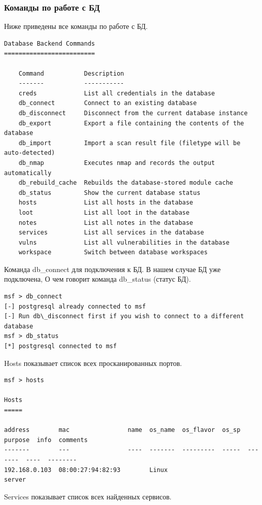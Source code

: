 \documentclass[10pt,a4paper]{report}
\begin{document}
\subsubsection{Команды по работе с БД}
Ниже приведены все команды по работе с БД.
\begin{verbatim}
Database Backend Commands
=========================

    Command           Description
    -------           -----------
    creds             List all credentials in the database
    db_connect        Connect to an existing database
    db_disconnect     Disconnect from the current database instance
    db_export         Export a file containing the contents of the database
    db_import         Import a scan result file (filetype will be auto-detected)
    db_nmap           Executes nmap and records the output automatically
    db_rebuild_cache  Rebuilds the database-stored module cache
    db_status         Show the current database status
    hosts             List all hosts in the database
    loot              List all loot in the database
    notes             List all notes in the database
    services          List all services in the database
    vulns             List all vulnerabilities in the database
    workspace         Switch between database workspaces
\end{verbatim}
Команда db\_connect для подключения к БД. В нашем случае БД уже подключена, О чем говорит команда db\_status (статус БД).
\begin{verbatim}
msf > db_connect
[-] postgresql already connected to msf
[-] Run db\_disconnect first if you wish to connect to a different database
msf > db_status
[*] postgresql connected to msf
\end{verbatim}
Hosts показывает список всех просканированных портов.
\begin{verbatim}
msf > hosts

Hosts
=====

address        mac                name  os_name  os_flavor  os_sp  purpose  info  comments
-------        ---                ----  -------  ---------  -----  -------  ----  --------
192.168.0.103  08:00:27:94:82:93        Linux                      server         
\end{verbatim}
Services показывает список всех найденных сервисов.
\end{document}
